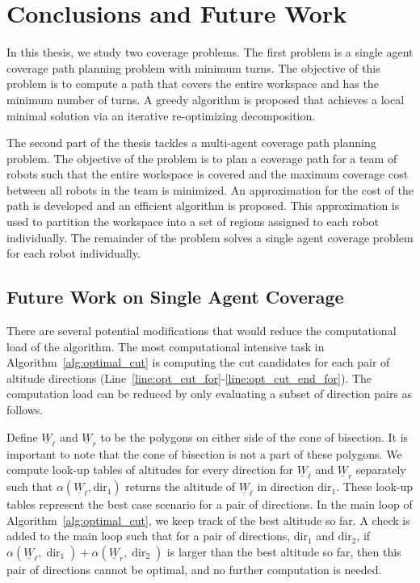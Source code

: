 \documentclass[../main.tex]{subfiles}
\begin{document}
\chapter{Conclusions and Future Work}
\label{chapter:future_work}

In this thesis, we study two coverage problems. The first problem is a single agent coverage path planning problem with minimum turns. The objective of this problem is to compute a path that covers the entire workspace and has the minimum number of turns. A greedy algorithm is proposed that achieves a local minimal solution via an iterative re-optimizing decomposition. 

The second part of the thesis tackles a multi-agent coverage path planning problem. The objective of the problem is to plan a coverage path for a team of robots such that the entire workspace is covered and the maximum coverage cost between all robots in the team is minimized. An approximation for the cost of the path is developed and an efficient algorithm is proposed. This approximation is used to partition the workspace into a set of regions assigned to each robot individually. The remainder of the problem solves a single agent coverage problem for each robot individually.

\section{Future Work on Single Agent Coverage}
\label{section:future_single}

There are several potential modifications that would reduce the computational load of the algorithm. The most computational intensive task in Algorithm~\ref{alg:optimal_cut} is computing the cut candidates for each pair of altitude directions (Line~\ref{line:opt_cut_for}-\ref{line:opt_cut_end_for}). The computation load can be reduced by only evaluating a subset of direction pairs as follows.

Define $\underline{W}_{\ell}$ and $\underline{W}_{r}$ to be the polygons on either side of the cone of bisection. It is important to note that the cone of bisection is not a part of these polygons. We compute look-up tables of altitudes for every direction for $\underline{W}_{\ell}$ and $\underline{W}_{r}$ separately such that $\alpha(\underline{W}_{\ell},\text{dir}_1)$ returns the altitude of $\underline{W}_{\ell}$ in direction $\text{dir}_1$. These look-up tables represent the best case scenario for a pair of directions. In the main loop of Algorithm~\ref{alg:optimal_cut}, we keep track of the best altitude so far. A check is added to the main loop such that for a pair of directions, $\text{dir}_1$ and $\text{dir}_2$, if $\alpha(\underline{W}_{\ell},\operatorname{dir}_1)+\alpha(\underline{W}_{r},\operatorname{dir}_2)$ is larger than the best altitude so far, then this pair of directions cannot be optimal, and no further computation is needed.
\end{document}
